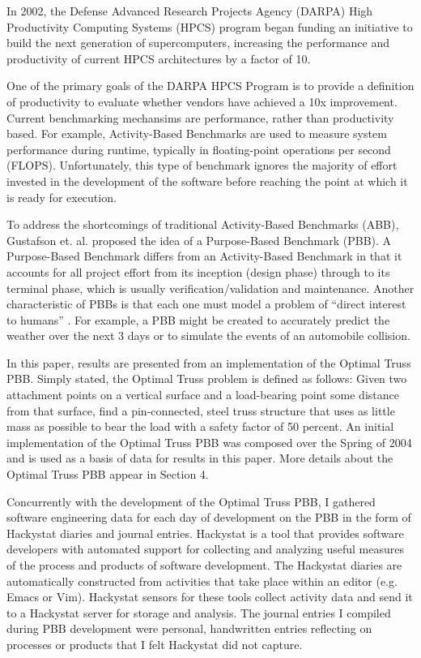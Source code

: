 
\label{sec:intro}

In 2002, the Defense Advanced Research Projects Agency (DARPA) High
Productivity Computing Systems (HPCS) program began funding an initiative to
build the next generation of supercomputers, increasing the
performance and productivity of current HPCS architectures by a factor
of 10.

One of the primary goals of the DARPA HPCS Program is to provide a
definition of productivity to evaluate whether vendors have achieved a
10x improvement\cite{Faulk04}.  Current benchmarking mechansims are
performance, rather than productivity based.  For example,
Activity-Based Benchmarks are used to measure system performance
during runtime, typically in floating-point operations per second
(FLOPS).  Unfortunately, this type of benchmark ignores the majority
of effort invested in the development of the software before reaching
the point at which it is ready for execution.

To address the shortcomings of traditional Activity-Based Benchmarks (ABB),
Gustafson et. al. \cite{Gustafson04} proposed the idea of a Purpose-Based
Benchmark (PBB).  A Purpose-Based Benchmark differs from an
Activity-Based Benchmark in that it accounts for all project effort
from its inception (design phase) through to its terminal phase,
which is usually verification/validation and maintenance.  Another
characteristic of PBBs is that each one must model a problem of ``direct
interest to humans'' \cite{Gustafson04}.  For example, a PBB might be
created to accurately predict the weather over the next 3 days or to
simulate the events of an automobile collision.

In this paper, results are presented from an implementation of the
Optimal Truss PBB.  Simply stated, the Optimal Truss problem is
defined as follows:  Given two attachment points on a vertical surface
and a load-bearing point some distance from that surface, find a
pin-connected, steel truss structure that uses as little mass as
possible to bear the load with a safety factor of 50 percent.  An initial
implementation of the Optimal Truss PBB was composed over the Spring of
2004 and is used as a basis of data for results in this paper.  More
details about the Optimal Truss PBB appear in Section 4.

Concurrently with the development of the Optimal Truss PBB, I gathered
software engineering data for each day of development on the PBB in
the form of Hackystat\cite{HackySite} diaries and journal entries.
Hackystat is a tool that provides software developers with automated
support for collecting and analyzing useful measures of the process
and products of software development.  The Hackystat diaries are
automatically constructed from activities that take place within an
editor (e.g. Emacs or Vim).  Hackystat sensors for these tools collect
activity data and send it to a Hackystat server for storage and
analysis.  The journal entries I compiled during PBB development were
personal, handwritten entries reflecting on processes or products that
I felt Hackystat did not capture.

